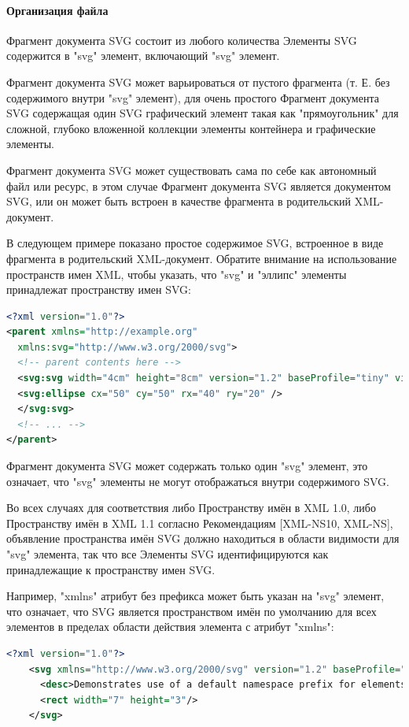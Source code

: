 \paragraph{Организация файла}

Фрагмент документа SVG состоит из любого количества Элементы SVG содержится в "svg" элемент, включающий "svg" элемент.

Фрагмент документа SVG может варьироваться от пустого фрагмента (т. Е. без содержимого внутри "svg" элемент), для очень простого Фрагмент документа SVG содержащая один SVG графический элемент такая как "прямоугольник" для сложной, глубоко вложенной коллекции элементы контейнера и графические элементы.

Фрагмент документа SVG может существовать сама по себе как автономный файл или ресурс, в этом случае Фрагмент документа SVG является документом SVG, или он может быть встроен в качестве фрагмента в родительский XML-документ.

В следующем примере показано простое содержимое SVG, встроенное в виде фрагмента в родительский XML-документ. Обратите внимание на использование пространств имен XML, чтобы указать, что "svg" и "эллипс" элементы принадлежат пространству имен SVG:
\begin{lstlisting}[language=XML,label=list:xml]
<?xml version="1.0"?>
<parent xmlns="http://example.org"
  xmlns:svg="http://www.w3.org/2000/svg">
  <!-- parent contents here -->
  <svg:svg width="4cm" height="8cm" version="1.2" baseProfile="tiny" viewBox="0 0 100 100">
  <svg:ellipse cx="50" cy="50" rx="40" ry="20" />
  </svg:svg>
  <!-- ... -->
</parent>
\end{lstlisting}

Фрагмент документа SVG может содержать только один "svg" элемент, это означает, что "svg" элементы не могут отображаться внутри содержимого SVG.

Во всех случаях для соответствия либо Пространству имён в XML 1.0, либо Пространству имён в XML 1.1 согласно Рекомендациям [XML-NS10, XML-NS], объявление пространства имён SVG должно находиться в области видимости для "svg" элемента, так что все Элементы SVG идентифицируются как принадлежащие к пространству имен SVG.

Например, "xmlns" атрибут без префикса может быть указан на "svg" элемент, что означает, что SVG является пространством имён по умолчанию для всех элементов в пределах области действия элемента с атрибут "xmlns":
\begin{lstlisting}[language=XML,label=list:xml]
	<?xml version="1.0"?>
	<svg xmlns="http://www.w3.org/2000/svg" version="1.2" baseProfile="tiny">
	  <desc>Demonstrates use of a default namespace prefix for elements.</desc>
	  <rect width="7" height="3"/>
	</svg>
\end{lstlisting}

